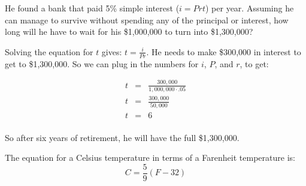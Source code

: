 \documentclass{exam}
\begin{document}
\begin{questions}
\begin{parts}
He found a bank that paid 5\% simple interest (\(i = Prt\)) per year. Assuming he can manage to survive without
spending any of the principal or interest, how long will he have to wait for his \$1,000,000 to turn into \$1,300,000?

\begin{solution}

Solving the equation for $t$ gives: \( t = \frac{i}{Pr} \).  He needs to make \$300,000 in interest to get to
\$1,300,000.  So we can plug in the numbers for $i$, $P$, and $r$, to get:

  \begin{eqnarray*}
    t & = & \frac{300,000}{1,000,000 \cdot .05}   \\
    t & = & \frac{300,000}{50,000}   \\
    t & = & 6 \\
  \end{eqnarray*}

  So after six years of retirement, he will have the full \$1,300,000.

\end{solution}

\end{parts}

\question 

The equation for a Celsius temperature in terms of a Farenheit temperature is:
\[C = \frac{5}{9} ( F - 32 ) \]

\end{questions}
\end{document}
